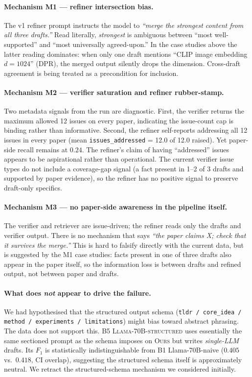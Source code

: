 \documentclass[11pt,a4paper]{article}
\begin{document}
\paragraph{Mechanism M1 — refiner intersection bias.}
The v1 refiner prompt instructs the model to \textit{``merge the
strongest content from all three drafts.''} Read literally,
\emph{strongest} is ambiguous between ``most well-supported'' and ``most
universally agreed-upon.'' In the case studies above the latter reading
dominates: when only one draft mentions ``CLIP image embedding $d\!=\!1024$''
(DPR), the merged output silently drops the dimension. Cross-draft
agreement is being treated as a precondition for inclusion.

\paragraph{Mechanism M2 — verifier saturation and refiner rubber-stamp.}
Two metadata signals from the run are diagnostic. First, the verifier
returns the maximum allowed 12 issues on every paper, indicating the
issue-count cap is binding rather than informative. Second, the refiner
self-reports addressing all 12 issues in every paper (mean
\texttt{issues\_addressed} = 12.0 of 12.0 raised). Yet paper-side recall
remains at $0.24$. The refiner's claim of having ``addressed'' issues
appears to be aspirational rather than operational. The current
verifier issue types do not include a coverage-gap signal (a fact
present in 1--2 of 3 drafts and supported by paper evidence), so the
refiner has no positive signal to preserve draft-only specifics.

\paragraph{Mechanism M3 — no paper-side awareness in the pipeline
itself.}
The verifier and retriever are issue-driven; the refiner reads only the
drafts and verifier output. There is no mechanism that says
\textit{``the paper claims X; check that it survives the merge.''} This
is hard to falsify directly with the current data, but is suggested by
the M1 case studies: facts present in one of three drafts also appear in
the paper itself, so the information loss is between drafts and refined
output, not between paper and drafts.

\paragraph{What does \emph{not} appear to drive the failure.}
We had hypothesised that the structured output schema (\texttt{tldr /
core\_idea / method / experiments / limitations}) might bias toward
abstract phrasing. The data does not support this. \textsc{B5
Llama-70B-structured} uses essentially the same sectioned prompt as the
schema imposes on \textsc{Ours} but writes \emph{single-LLM} drafts.
Its $F_1$ is statistically indistinguishable from B1 Llama-70B-naive
($0.405$ vs.\ $0.418$, CI overlap), suggesting the structured schema
itself is approximately neutral. We retract the structured-schema
mechanism we considered initially.
\end{document}
